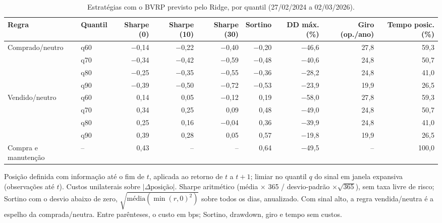 \begin{table}[H]
\centering
\small
\caption{Estratégias com o BVRP previsto pelo Ridge, por quantil (27/02/2024 a 02/03/2026).}
\label{tab:A1-quantis}
\begin{tabular}{llrrrrrrr}
\toprule
Regra & Quantil & Sharpe (0) & Sharpe (10) & Sharpe (30) & Sortino & DD máx. (\%) & Giro (op./ano) & Tempo posic. (\%) \\
\midrule
Comprado/neutro & q60 & $-$0{,}14 & $-$0{,}22 & $-$0{,}40 & $-$0{,}20 & $-$46{,}6 & 27{,}8 & 59{,}3 \\
 & q70 & $-$0{,}34 & $-$0{,}42 & $-$0{,}59 & $-$0{,}48 & $-$40{,}6 & 24{,}8 & 50{,}7 \\
 & q80 & $-$0{,}25 & $-$0{,}35 & $-$0{,}55 & $-$0{,}36 & $-$28{,}2 & 24{,}8 & 41{,}0 \\
 & q90 & $-$0{,}39 & $-$0{,}50 & $-$0{,}72 & $-$0{,}53 & $-$23{,}9 & 19{,}9 & 26{,}5 \\
\midrule
Vendido/neutro & q60 & 0{,}14 & 0{,}05 & $-$0{,}12 & 0{,}19 & $-$58{,}0 & 27{,}8 & 59{,}3 \\
 & q70 & 0{,}34 & 0{,}25 & 0{,}09 & 0{,}48 & $-$49{,}0 & 24{,}8 & 50{,}7 \\
 & q80 & 0{,}25 & 0{,}16 & $-$0{,}04 & 0{,}36 & $-$39{,}9 & 24{,}8 & 41{,}0 \\
 & q90 & 0{,}39 & 0{,}28 & 0{,}05 & 0{,}57 & $-$19{,}8 & 19{,}9 & 26{,}5 \\
\midrule
Compra e manutenção & -- & 0{,}43 & -- & -- & 0{,}64 & $-$49{,}5 & -- & 100{,}0 \\
\bottomrule
\end{tabular}

\par\smallskip\parbox{\linewidth}{\footnotesize Posição definida com informação até o fim de $t$, aplicada ao retorno de $t$ a $t+1$; limiar no quantil $q$ do sinal em janela expansiva (observações até $t$). Custos unilaterais sobre $|\Delta \text{posição}|$. Sharpe aritmético (média $\times$ 365 / desvio-padrão $\times \sqrt{365}$), sem taxa livre de risco; Sortino com o desvio abaixo de zero, $\sqrt{\text{média}(\min(r, 0)^2)}$ sobre todos os dias, anualizado. Com sinal alto, a regra vendida/neutra é a espelho da comprada/neutra. Entre parênteses, o custo em bps; Sortino, drawdown, giro e tempo sem custos.}
\end{table}

